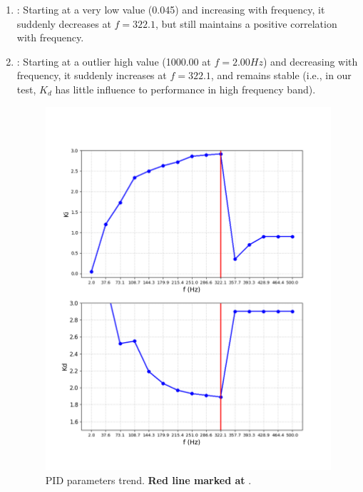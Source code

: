 \documentclass[conference]{IEEEtran}
\begin{document}
\begin{itemize}
    \begin{enumerate}
        \item {}: Starting at a very low value (0.045) and increasing with frequency, it suddenly decreases at $f = 322.1$, but still maintains a positive correlation with frequency.
        \item {}: Starting at a outlier high value (1000.00 at $f=2.00Hz$) and decreasing with frequency, it suddenly increases at $f = 322.1$, and remains stable (i.e., in our test, $K_{d}$ has little influence to performance in high frequency band).
        \begin{figure}
            \centering
            \includegraphics[width=1.1\linewidth]{Report/Pic/KiKdTrend.png}
            \caption{PID parameters trend. \textbf{Red line marked at }.}
            \label{KiTrend}
        \end{figure}

\end{enumerate}
\end{itemize}
\end{document}
